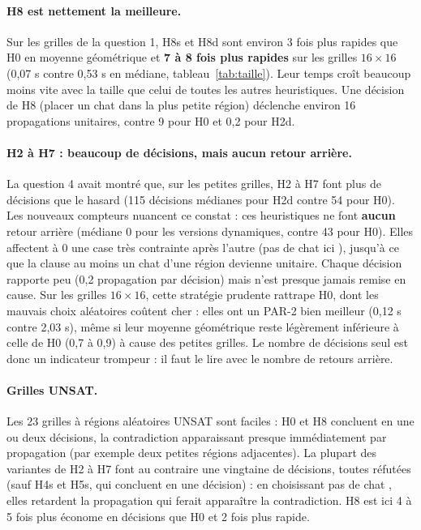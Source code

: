 \documentclass[11pt,a4paper]{article}
\begin{document}
\paragraph{H8 est nettement la meilleure.} Sur les grilles de la question 1,
H8s et H8d sont environ 3 fois plus rapides que H0 en moyenne géométrique et
\textbf{7 à 8 fois plus rapides} sur les grilles $16 \times 16$ (0,07 s contre
0,53 s en médiane, tableau~\ref{tab:taille}). Leur temps croît beaucoup
moins vite avec la taille que celui de toutes les autres heuristiques. Une
décision de H8 (placer un chat dans la plus petite région) déclenche environ
16 propagations unitaires, contre 9 pour H0 et 0,2 pour H2d.

\paragraph{H2 à H7 : beaucoup de décisions, mais aucun retour arrière.}
La question 4 avait montré que, sur les petites grilles, H2 à H7 font plus de
décisions que le hasard (115 décisions médianes pour H2d contre 54 pour H0).
Les nouveaux compteurs nuancent ce constat : ces heuristiques ne font
\textbf{aucun} retour arrière (médiane 0 pour les versions dynamiques,
contre 43 pour H0). Elles affectent à 0 une case très contrainte après
l'autre (\og pas de chat ici \fg{}), jusqu'à ce que la clause
\og au moins un chat \fg{} d'une région devienne unitaire. Chaque décision
rapporte peu (0,2 propagation par décision) mais n'est presque jamais
remise en cause. Sur les grilles $16 \times 16$, cette stratégie prudente
rattrape H0, dont les mauvais choix aléatoires coûtent cher : elles ont un
PAR-2 bien meilleur (0,12 s contre 2,03 s), même si leur moyenne
géométrique reste légèrement inférieure à celle de H0 (0,7 à 0,9) à cause
des petites grilles. Le nombre de décisions seul est donc un indicateur
trompeur : il faut le lire avec le nombre de retours arrière.

\paragraph{Grilles UNSAT.} Les 23 grilles à régions aléatoires UNSAT sont
faciles : H0 et H8 concluent en une ou deux décisions, la contradiction
apparaissant presque immédiatement par propagation (par exemple deux
petites régions adjacentes). La plupart des variantes de H2 à H7 font au
contraire une vingtaine de décisions, toutes réfutées (sauf H4s et H5s, qui
concluent en une décision) : en choisissant \og pas de chat \fg{}, elles
retardent la propagation qui ferait apparaître la contradiction.
H8 est ici 4 à 5 fois plus économe en décisions que H0 et 2 fois plus
rapide.
\end{document}
